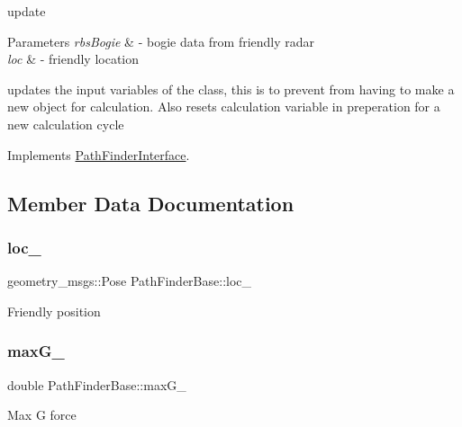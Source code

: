 update 


\begin{DoxyParams}{Parameters}
{\em rbs\+Bogie} & -\/ bogie data from friendly radar \\
\hline
{\em loc} & -\/ friendly location\\
\hline
\end{DoxyParams}
updates the input variables of the class, this is to prevent from having to make a new object for calculation. Also resets calculation variable in preperation for a new calculation cycle 

Implements \hyperlink{classPathFinderInterface_a8a2011052fb64cab85a66a21092416f2}{Path\+Finder\+Interface}.



\subsection{Member Data Documentation}
\mbox{\label{classPathFinderBase_a9d62a43efa54ce2bb88b43e3dd40ecdc}} 
\subsubsection{\texorpdfstring{loc\+\_\+}{loc\_}}
{\footnotesize\ttfamily geometry\+\_\+msgs\+::\+Pose Path\+Finder\+Base\+::loc\+\_\+\hspace{0.3cm}{\ttfamily [protected]}}

Friendly position \mbox{\label{classPathFinderBase_ab091d8e0e0395d7ee4f4b139e62145d8}} 
\subsubsection{\texorpdfstring{max\+G\+\_\+}{maxG\_}}
{\footnotesize\ttfamily double Path\+Finder\+Base\+::max\+G\+\_\+\hspace{0.3cm}{\ttfamily [protected]}}

Max G force \mbox{\label{classPathFinderBase_a1161854780f0ca7860878bf3288a4d7d}} 

